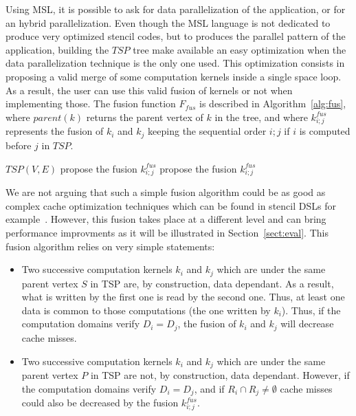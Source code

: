 Using MSL, it is possible to ask for data parallelization of the application, or for an hybrid parallelization. Even though the MSL language is not dedicated to produce very optimized stencil codes, but to produces the parallel pattern of the application, building the $TSP$ tree make available an easy optimization when the data parallelization technique is the only one used. This optimization consists in proposing a valid merge of some computation kernels inside a single space loop. As a result, the user can use this valid fusion of kernels or not when implementing those. The fusion function $F_{fus}$ is described in Algorithm~\ref{alg:fus}, where $parent(k)$ returns the parent vertex of $k$ in the tree, and where $k_{i;j}^{fus}$ represents the fusion of $k_i$ and $k_j$ keeping the sequential order $i;j$ if $i$ is computed before $j$ in $TSP$.

\begin{algorithm}
\caption{$F_{fus}$}
\label{alg:fus}
\begin{algorithmic}[1]
 {$TSP(V,E)$}
\State propose the fusion $k_{i;j}^{fus}$
\EndIf
{}
\State propose the fusion $k_{i;j}^{fus}$
\EndIf
\EndIf
\EndIf
\EndIf
\EndFor
\EndProcedure
\end{algorithmic}
\end{algorithm}

We are not arguing that such a simple fusion algorithm could be as good as complex cache optimization techniques which can be found in stencil DSLs for example~\cite{spaaTangCKLL11}. However, this fusion takes place at a different level and can bring performance improvments as it will be illustrated in Section~\ref{sect:eval}. This fusion algorithm relies on very simple statements:
\begin{itemize}
\item Two successive computation kernels $k_i$ and $k_j$ which are under the same parent vertex $S$ in TSP are, by construction, data dependant. As a result, what is written by the first one is read by the second one. Thus, at least one data is common to those computations (the one written by $k_i$). Thus, if the computation domains verify $D_i=D_j$, the fusion of $k_i$ and $k_j$ will decrease cache misses.
\item Two successive computation kernels $k_i$ and $k_j$ which are under the same parent vertex $P$ in TSP are not, by construction, data dependant. However, if the computation domains verify $D_i=D_j$, and if $R_i \cap R_j \neq \emptyset$ cache misses could also be decreased by the fusion $k_{i;j}^{fus}$.
\end{itemize}

